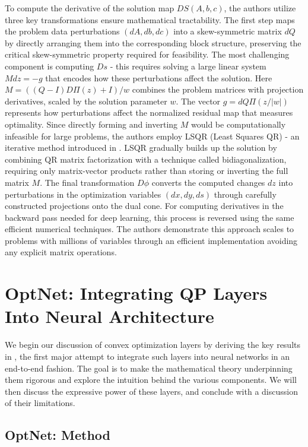 \documentclass{article}
\begin{document}
To compute the derivative of the solution map $DS(A,b,c)$, the authors utilize three key transformations ensure mathematical tractability. The first step maps the problem data perturbations $(dA,db,dc)$ into a skew-symmetric matrix $dQ$ by directly arranging them into the corresponding block structure, preserving the critical skew-symmetric property required for feasibility. The most challenging component is computing $Ds$ - this requires solving a large linear system $Mdz = -g$ that encodes how these perturbations affect the solution. Here $M = ((Q-I)D\Pi(z)+I)/w$ combines the problem matrices with projection derivatives, scaled by the solution parameter $w$. The vector $g = dQ\Pi(z/|w|)$ represents how perturbations affect the normalized residual map that measures optimality. Since directly forming and inverting $M$ would be computationally infeasible for large problems, the authors employ LSQR (Least Squares QR) - an iterative method introduced in \citep{lsqr}. LSQR gradually builds up the solution by combining QR matrix factorization with a technique called bidiagonalization, requiring only matrix-vector products rather than storing or inverting the full matrix $M$. The final transformation $D\phi$ converts the computed changes $dz$ into perturbations in the optimization variables $(dx,dy,ds)$ through carefully constructed projections onto the dual cone. For computing derivatives in the backward pass needed for deep learning, this process is reversed using the same efficient numerical techniques. The authors demonstrate this approach scales to problems with millions of variables through an efficient implementation avoiding any explicit matrix operations.

\section{OptNet: Integrating QP Layers Into Neural Architecture}
We begin our discussion of convex optimization layers by deriving the key results in \citep{optnet}, the first major attempt to integrate such layers into neural networks in an end-to-end fashion. The goal is to make the mathematical theory underpinning them rigorous and explore the intuition behind the various components. We will then discuss the expressive power of these layers, and conclude with a discussion of their limitations. 

\subsection{OptNet: Method}
\end{document}

